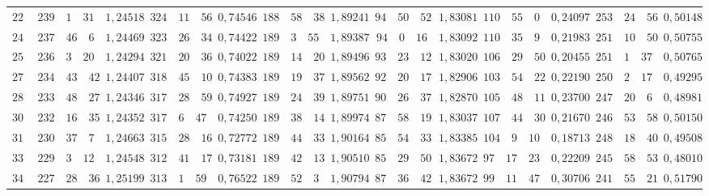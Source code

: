 \begin{landscape}
\begin{center}
\begin{tabular}{r|r|r|r|r|r|r|r|r|r|r|r|r}
\(225\) & \(239\quad 1\quad 31\) & \(1{,}24518\) & \(324\quad 11\quad 56\) & \(0{,}74546\) & \(188\quad 58\quad 38\) & \(1{,}89241\) & \(94\quad 50\quad 52\) & \(1{,}83081\) & \(110\quad 55\quad 0\) & \(0{,}24097\) & \(253\quad 24\quad 56\) & \(0{,}50148\) \\[3pt]
\(240\) & \(237\quad 46\quad 6\) & \(1{,}24469\) & \(323\quad 26\quad 34\) & \(0{,}74422\) & \(189\quad 3\quad 55\) & \(1{,}89387\) & \(94\quad 0\quad 16\) & \(1{,}83092\) & \(110\quad 35\quad 9\) & \(0{,}21983\) & \(251\quad 10\quad 50\) & \(0{,}50755\) \\
\(255\) & \(236\quad 3\quad 20\) & \(1{,}24294\) & \(321\quad 20\quad 36\) & \(0{,}74022\) & \(189\quad 14\quad 20\) & \(1{,}89496\) & \(93\quad 23\quad 12\) & \(1{,}83020\) & \(106\quad 29\quad 50\) & \(0{,}20455\) & \(251\quad 1\quad 37\) & \(0{,}50765\) \\
\(270\) & \(234\quad 43\quad 42\) & \(1{,}24407\) & \(318\quad 45\quad 10\) & \(0{,}74383\) & \(189\quad 19\quad 37\) & \(1{,}89562\) & \(92\quad 20\quad 17\) & \(1{,}82906\) & \(103\quad 54\quad 22\) & \(0{,}22190\) & \(250\quad 2\quad 17\) & \(0{,}49295\) \\
\(285\) & \(233\quad 48\quad 27\) & \(1{,}24346\) & \(317\quad 28\quad 59\) & \(0{,}74927\) & \(189\quad 24\quad 39\) & \(1{,}89751\) & \(90\quad 26\quad 37\) & \(1{,}82870\) & \(105\quad 48\quad 11\) & \(0{,}23700\) & \(247\quad 20\quad 6\) & \(0{,}48981\) \\[3pt]
\(300\) & \(232\quad 16\quad 35\) & \(1{,}24352\) & \(317\quad 6\quad 47\) & \(0{,}74250\) & \(189\quad 38\quad 14\) & \(1{,}89974\) & \(87\quad 58\quad 19\) & \(1{,}83037\) & \(107\quad 44\quad 30\) & \(0{,}21670\) & \(246\quad 53\quad 58\) & \(0{,}50150\) \\
\(315\) & \(230\quad 37\quad 7\) & \(1{,}24663\) & \(315\quad 28\quad 16\) & \(0{,}72772\) & \(189\quad 44\quad 33\) & \(1{,}90164\) & \(85\quad 54\quad 33\) & \(1{,}83385\) & \(104\quad 9\quad 10\) & \(0{,}18713\) & \(248\quad 18\quad 40\) & \(0{,}49508\) \\
\(330\) & \(229\quad 3\quad 12\) & \(1{,}24548\) & \(312\quad 41\quad 17\) & \(0{,}73181\) & \(189\quad 42\quad 13\) & \(1{,}90510\) & \(85\quad 29\quad 50\) & \(1{,}83672\) & \(97\quad 17\quad 23\) & \(0{,}22209\) & \(245\quad 58\quad 53\) & \(0{,}48010\) \\
\(345\) & \(227\quad 28\quad 36\) & \(1{,}25199\) & \(313\quad 1\quad 59\) & \(0{,}76522\) & \(189\quad 52\quad 3\) & \(1{,}90794\) & \(87\quad 36\quad 42\) & \(1{,}83672\) & \(99\quad 11\quad 47\) & \(0{,}30706\) & \(241\quad 55\quad 21\) & \(0{,}51790\) \\

\end{tabular}
\end{center}
\end{landscape}
